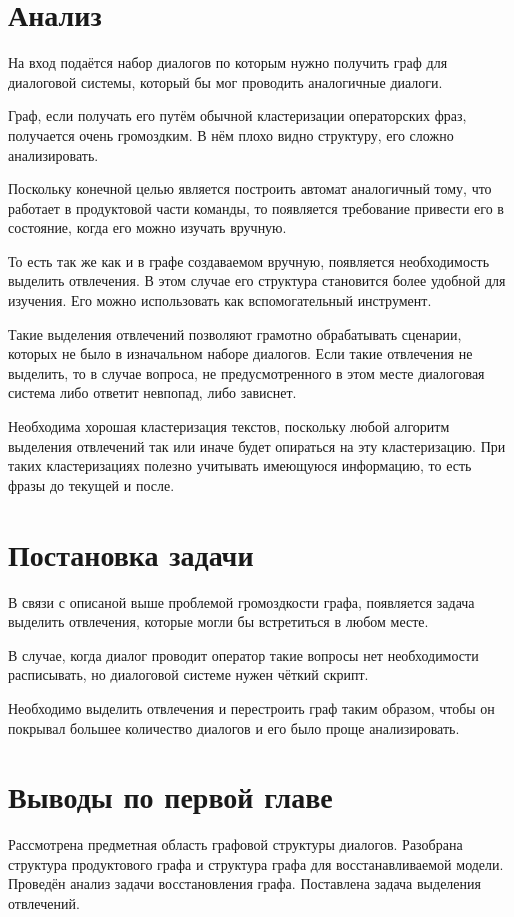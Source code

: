 \documentclass[specification,annotation]{itmo-student-thesis}
\begin{document}
	\section{Анализ}
	На вход подаётся набор диалогов по которым нужно получить граф для диалоговой системы, который бы мог проводить аналогичные диалоги.
	
	Граф, если получать его путём обычной кластеризации операторских фраз, получается очень громоздким. В нём плохо видно структуру, его сложно анализировать.
	
	Поскольку конечной целью является построить автомат аналогичный тому, что работает в продуктовой части команды, то появляется требование привести его в состояние, когда его можно изучать вручную. 
	
	То есть так же как и в графе создаваемом вручную, появляется необходимость выделить отвлечения. В этом случае его структура становится более удобной для изучения. Его можно использовать как вспомогательный инструмент. 
	
	Такие выделения отвлечений позволяют грамотно обрабатывать сценарии, которых не было в изначальном наборе диалогов. Если такие отвлечения не выделить, то в случае вопроса, не предусмотренного в этом месте диалоговая система либо ответит невпопад, либо зависнет.
	
	Необходима хорошая кластеризация текстов, поскольку любой алгоритм выделения отвлечений так или иначе будет опираться на эту кластеризацию. При таких кластеризациях полезно учитывать имеющуюся информацию, то есть фразы до текущей и после.
	
	
	\section{Постановка задачи}
	В связи с описаной выше проблемой громоздкости графа, появляется задача выделить отвлечения, которые могли бы встретиться в любом месте.
	
	В случае, когда диалог проводит оператор такие вопросы нет необходимости расписывать, но диалоговой системе нужен чёткий скрипт.
	
	Необходимо выделить отвлечения и перестроить граф таким образом, чтобы он покрывал большее количество диалогов и его было проще анализировать.
	
	\section{Выводы по первой главе}
	Рассмотрена предметная область графовой структуры диалогов. Разобрана структура продуктового графа и структура графа для восстанавливаемой модели. Проведён анализ задачи восстановления графа. Поставлена задача выделения отвлечений. 
	
\end{document}
